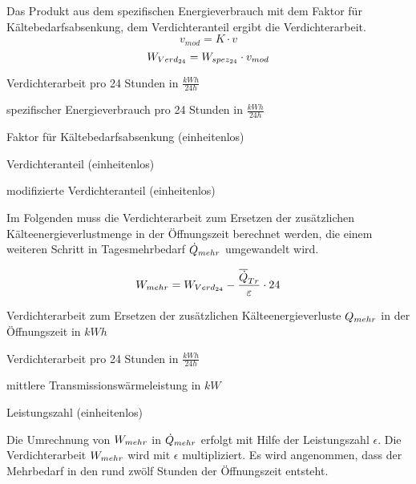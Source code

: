 Das Produkt aus dem spezifischen Energieverbrauch mit dem Faktor für
Kältebedarfsabsenkung, dem Verdichteranteil ergibt die Verdichterarbeit.
\begin{equation}
	v_{mod} = K \cdot v
\label{vmod}
\end{equation}
\begin{equation}
	\lverd = \lspez \cdot v_{mod}
\label{lverd}
\end{equation}

\begin{description}[\dth]

	\item[$\lverd$] Verdichterarbeit pro 24 Stunden in $\frac{kWh}{24h}$
	\item[$\lspez$] spezifischer Energieverbrauch pro 24 Stunden in
		$\frac{kWh}{24h}$
	\item[$K$] Faktor für Kältebedarfsabsenkung (einheitenlos)
	\item[$v$] Verdichteranteil (einheitenlos)
	\item[$v_{mod}$] modifizierte Verdichteranteil (einheitenlos)

\end{description}
\vspace{0.5cm}

Im Folgenden muss die Verdichterarbeit zum Ersetzen der zus\"atzlichen
K\"alteenergieverlustmenge in der \"Offnungszeit berechnet werden, die einem
weiteren Schritt in Tagesmehrbedarf $\dot{Q}_{mehr}$ umgewandelt wird.

\begin{equation}
	\lmehr = \lverd - \frac{\aptrans}{\epsilon} \cdot 24
\label{lmehr}
\end{equation}

\begin{description}[\dth]

	\item[$\lmehr$] Verdichterarbeit zum Ersetzen der zus\"atzlichen
	K\"alteenergieverluste $Q_{mehr}$ in der \"Offnungszeit in $kWh$
	\item[$\lverd$] Verdichterarbeit pro 24 Stunden in $\frac{kWh}{24h}$
	\item[$\aptrans$] mittlere Transmissionswärmeleistung in $kW$
	\item[$\epsilon$] Leistungszahl (einheitenlos)

\end{description}
\vspace{0.5cm}

Die Umrechnung von $\lmehr$ in $\dot{Q}_{mehr}$ erfolgt mit Hilfe der Leistungszahl
$\epsilon$. Die Verdichterarbeit $\lmehr$ wird mit $\epsilon$ multipliziert.
Es wird angenommen, dass der Mehrbedarf in den rund zw\"olf Stunden der
\"Offnungszeit entsteht.

